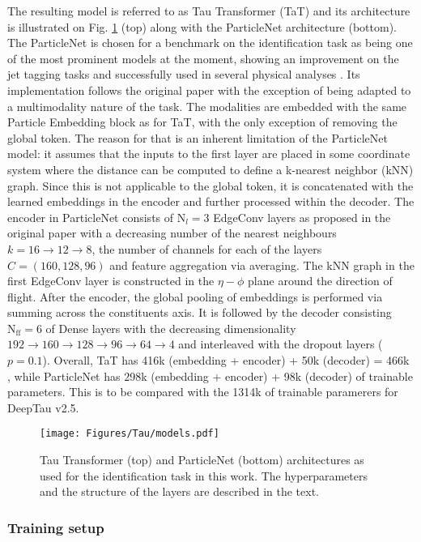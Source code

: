 The resulting model is referred to as Tau Transformer (TaT) and its architecture is illustrated on Fig. \ref{fig:models} (top) along with the ParticleNet \cite{Qu:2019gqs} architecture (bottom). The ParticleNet is chosen for a benchmark on the \tauh identification task as being one of the most prominent models at the moment, showing an improvement on the jet tagging tasks and successfully used in several physical analyses \cite{CMS:2022psv, CMS:2022nmn}. Its implementation follows the original paper with the exception of being adapted to a multimodality nature of the task. The modalities are embedded with the same Particle Embedding block as for TaT, with the only exception of removing the global token. The reason for that is an inherent limitation of the ParticleNet model: it assumes that the inputs to the first layer are placed in some coordinate system where the distance can be computed to define a k-nearest neighbor (kNN) graph. Since this is not applicable to the global token, it is concatenated with the learned embeddings in the encoder and further processed within the decoder. The encoder in ParticleNet consists of $\text{N}_l=3$ EdgeConv layers as proposed in the original paper with a decreasing number of the nearest neighbours $k = 16 \to 12 \to 8$, the number of channels for each of the layers $C = (160, 128, 96)$ and feature aggregation via averaging. The kNN graph in the first EdgeConv layer is constructed in the $\eta-\phi$ plane around the \tauh direction of flight. After the encoder, the global pooling of embeddings is performed via summing across the constituents axis. It is followed by the decoder consisting $\text{N}_\text{ff}=6$ of Dense layers with the decreasing dimensionality $192 \to 160 \to 128 \to 96 \to 64 \to 4$ and interleaved with the dropout layers ($p=0.1$). Overall, TaT has 416k (embedding + encoder) + 50k (decoder) = 466k , while ParticleNet has 298k (embedding + encoder) + 98k (decoder) of trainable parameters. This is to be compared with the 1314k of trainable paramerers for DeepTau v2.5. 

\begin{figure}[ht!]
    \centering
    \texttt{[image: Figures/Tau/models.pdf]}
    \caption{Tau Transformer (top) and ParticleNet (bottom) architectures as used for the \tauh identification task in this work. The hyperparameters and the structure of the layers are described in the text.}
    \label{fig:models}
\end{figure}

\subsubsection{Training setup} 


